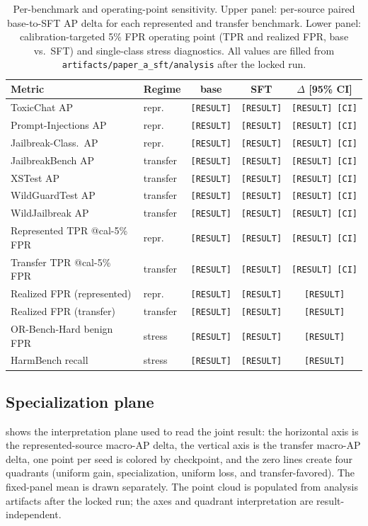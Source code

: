 \documentclass[sigconf,nonacm]{acmart}
\newcommand{\RES}{\texttt{[RESULT]}}
\newcommand{\CI}{\texttt{[CI]}}
\begin{document}
\begin{table}[t]
\centering
\small
\setlength{\tabcolsep}{4pt}
\caption{Per-benchmark and operating-point sensitivity. Upper panel: per-source paired base-to-SFT AP delta for each represented and transfer benchmark. Lower panel: calibration-targeted 5\% FPR operating point (TPR and realized FPR, base vs.\ SFT) and single-class stress diagnostics. All values are filled from \texttt{artifacts/paper\_a\_sft/analysis} after the locked run.}
\label{tab:sensitivity}
\begin{tabular}{llccc}
\toprule
Metric & Regime & base & SFT & $\Delta$ [95\% CI] \\
\midrule
ToxicChat AP & repr. & \RES & \RES & \RES\ \CI \\
Prompt-Injections AP & repr. & \RES & \RES & \RES\ \CI \\
Jailbreak-Class.\ AP & repr. & \RES & \RES & \RES\ \CI \\
JailbreakBench AP & transfer & \RES & \RES & \RES\ \CI \\
XSTest AP & transfer & \RES & \RES & \RES\ \CI \\
WildGuardTest AP & transfer & \RES & \RES & \RES\ \CI \\
WildJailbreak AP & transfer & \RES & \RES & \RES\ \CI \\
\midrule
Represented TPR @cal-5\% FPR & repr. & \RES & \RES & \RES\ \CI \\
Transfer TPR @cal-5\% FPR & transfer & \RES & \RES & \RES\ \CI \\
Realized FPR (represented) & repr. & \RES & \RES & \RES \\
Realized FPR (transfer) & transfer & \RES & \RES & \RES \\
OR-Bench-Hard benign FPR & stress & \RES & \RES & \RES \\
HarmBench recall & stress & \RES & \RES & \RES \\
\bottomrule
\end{tabular}
\end{table}

\subsection{Specialization plane}
\label{subsec:plane}

 shows the interpretation plane used to read the joint result: the horizontal axis is the represented-source macro-AP delta, the vertical axis is the transfer macro-AP delta, one point per seed is colored by checkpoint, and the zero lines create four quadrants (uniform gain, specialization, uniform loss, and transfer-favored). The fixed-panel mean is drawn separately. The point cloud is populated from analysis artifacts after the locked run; the axes and quadrant interpretation are result-independent.
\end{document}
